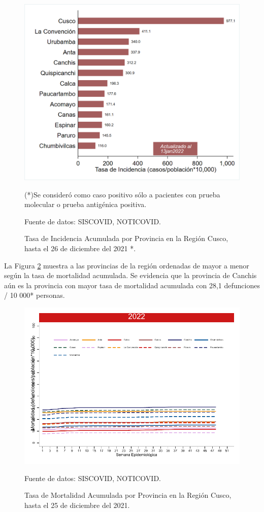 \documentclass[12pt,a4paper,openany]{book}
\begin{document}
\begin{figure}[!htpb]
	\caption{Tasa de Incidencia Acumulada por Provincia en la Región Cusco, hasta el 26 de diciembre del 2021 *. }\label{fig:incidencia_provincias}
	\begin{center}
		\includegraphics[width=0.75\linewidth]{../figuras/incidencia_provincial}
	\end{center}
	{\footnotesize {(*)Se consideró como caso positivo sólo a pacientes con prueba molecular o prueba antigénica positiva. 
			
	Fuente de datos: SISCOVID, NOTICOVID.}}
\end{figure}


La Figura \ref{fig:mortalidad_ordenada} muestra a las provincias de la región ordenadas de mayor a menor según la tasa de mortalidad acumulada. Se evidencia que la provincia de Canchis aún es la provincia con mayor tasa de mortalidad acumulada con 28,1 defunciones / 10 000* personas.  

\begin{figure}[h]
	\caption{Tasa de Mortalidad Acumulada por Provincia en la Región Cusco, hasta el 25 de diciembre del 2021. }\label{fig:mortalidad_ordenada}
	\begin{center}
		\includegraphics[width=0.65\linewidth]{../figuras/mortalidad_provincial}
	\end{center}
	{\footnotesize {Fuente de datos: SISCOVID, NOTICOVID.}}
\end{figure}
\end{document}
